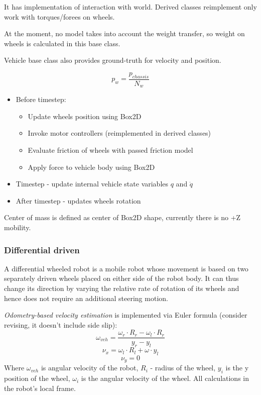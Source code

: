 \documentclass[a4paper,11pt]{article}
\begin{document}
It has implementation of interaction with world. Derived classes reimplement only work with torques/forees on wheels. 

At the moment, no model takes into account the weight transfer, so weight on wheels is calculated in this base class.

Vehicle base class also provides ground-truth for velocity and position. 
\begin{center}
\[
p_w = \frac{p_{chassis}}{N_w}
\]
\end{center}

\begin{itemize}
	\item Before timestep:
	\begin{itemize}
		\item Update wheels position using Box2D
		\item Invoke motor controllers (reimplemented in derived classes)
		\item Evaluate friction of wheels with passed friction model
		\item Apply force to vehicle body using Box2D
	\end{itemize}
	\item Timestep - update internal vehicle state variables $q$ and $\dot{q}$
	\item After timestep - updates wheels rotation		
\end{itemize}

Center of mass is defined as center of Box2D shape, currently there is no +Z mobility. 
 
\subsubsection{Differential driven}

A differential wheeled robot is a mobile robot whose movement is based on two separately driven wheels placed on either side of the robot body. It can thus change its direction by varying the relative rate of rotation of its wheels and hence does not require an additional steering motion.

\textit{Odometry-based velocity estimation} is implemented via Euler formula (consider revising, it doesn't include side slip):
\[
\omega_{veh} = \frac{\omega_r \cdot R_r - \omega_l \cdot R_r}{y_r - y_l}
\]
\[
\nu_x = \omega_l \cdot R_l + \omega \cdot y_l
\]
\[
\nu_y = 0
\]
Where $\omega_{veh}$ is angular velocity of the robot, $R_i$ - radius of the wheel, $y_i$ is the y position of the wheel, $\omega_i$ is the angular velocity of the wheel. All calculations in the robot's local frame. 
\end{document}
